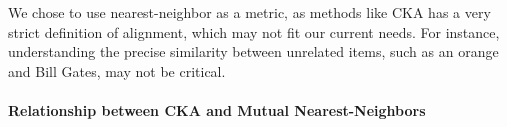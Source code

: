 We chose to use nearest-neighbor as a metric, as methods like CKA has a very strict definition of alignment, which may not fit our current needs. 
For instance, understanding the precise similarity between unrelated items, such as an orange and Bill Gates, may not be critical.%


\paragraph{Relationship between CKA and Mutual Nearest-Neighbors}

